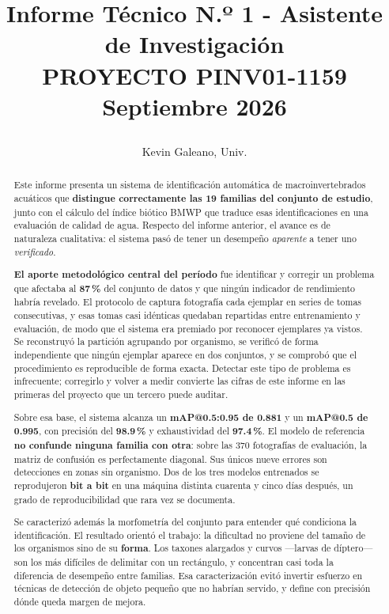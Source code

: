\documentclass[onecolumn]{article}
\title{\vspace{-1.5cm}
\begin{center}
\LARGE
\textbf{Informe Técnico N.º 1 - Asistente de Investigación\\
PROYECTO PINV01-1159} \\
\Large Septiembre 2026
\vspace{0.5cm}
\end{center}
}
\author[1]{Kevin Galeano, Univ.\orcidlink{0009-0002-5536-8315}}
\affil[1]{
\small
gsmkev@gmail.com ArtICS Lab S.R.L. San Lorenzo, Paraguay.
}
\date{}
\begin{document}
\thispagestyle{firstpagestyle}
\maketitle

\vspace{-0.5cm}
\begin{abstract}
Este informe presenta un sistema de identificación automática de macroinvertebrados acuáticos que \textbf{distingue correctamente las 19 familias del conjunto de estudio}, junto con el cálculo del índice biótico BMWP que traduce esas identificaciones en una evaluación de calidad de agua. Respecto del informe anterior, el avance es de naturaleza cualitativa: el sistema pasó de tener un desempeño \emph{aparente} a tener uno \emph{verificado}.

\textbf{El aporte metodológico central del período} fue identificar y corregir un problema que afectaba al \textbf{87\,\%} del conjunto de datos y que ningún indicador de rendimiento habría revelado. El protocolo de captura fotografía cada ejemplar en series de tomas consecutivas, y esas tomas casi idénticas quedaban repartidas entre entrenamiento y evaluación, de modo que el sistema era premiado por reconocer ejemplares ya vistos. Se reconstruyó la partición agrupando por organismo, se verificó de forma independiente que ningún ejemplar aparece en dos conjuntos, y se comprobó que el procedimiento es reproducible de forma exacta. Detectar este tipo de problema es infrecuente; corregirlo y volver a medir convierte las cifras de este informe en las primeras del proyecto que un tercero puede auditar.

Sobre esa base, el sistema alcanza un \textbf{mAP@0.5:0.95 de 0.881} y un \textbf{mAP@0.5 de 0.995}, con precisión del \textbf{98.9\,\%} y exhaustividad del \textbf{97.4\,\%}. El modelo de referencia \textbf{no confunde ninguna familia con otra}: sobre las 370 fotografías de evaluación, la matriz de confusión es perfectamente diagonal. Sus únicos nueve errores son detecciones en zonas sin organismo. Dos de los tres modelos entrenados se reprodujeron \textbf{bit a bit} en una máquina distinta cuarenta y cinco días después, un grado de reproducibilidad que rara vez se documenta.

Se caracterizó además la morfometría del conjunto para entender qué condiciona la identificación. El resultado orientó el trabajo: la dificultad no proviene del tamaño de los organismos sino de su \textbf{forma}. Los taxones alargados y curvos ---larvas de díptero--- son los más difíciles de delimitar con un rectángulo, y concentran casi toda la diferencia de desempeño entre familias. Esa caracterización evitó invertir esfuerzo en técnicas de detección de objeto pequeño que no habrían servido, y define con precisión dónde queda margen de mejora.
\vspace{0.5cm}
\end{abstract}
\end{document}

